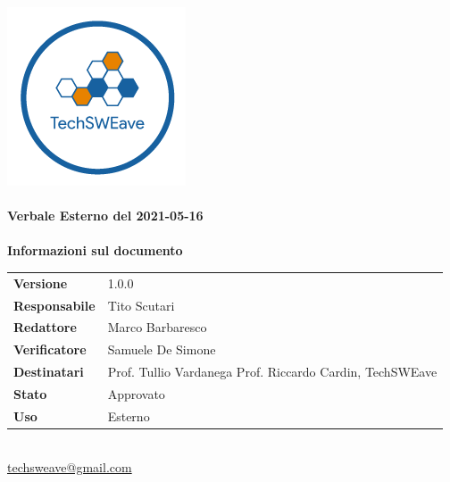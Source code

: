 \documentclass[a4paper]{article}
\begin{document}
\begin{titlepage}
    \begin{center}
        \includegraphics{../../../../Images/logo.png}\\
        \vspace{20px}
        \textcolor{logo}{\hrulefill}\\
        \vspace{20px}
        \textbf{\huge\textcolor{logo}{Verbale Esterno del 2021-05-16}}\\
        \vspace{10px}
        \textcolor{logo}{\hrulefill}\\
        \vspace{40px}
        \textbf{\Large Informazioni sul documento}\\
        \vspace{20px}
        \begin{tabular}{p{100px} | p{100px}}
            \textbf{Versione}     & 1.0.0                                                                      \\
            \textbf{Responsabile} & Tito Scutari                                                               \\
            \textbf{Redattore}    & Marco Barbaresco                                                           \\
            \textbf{Verificatore} & Samuele De Simone                                                          \\
            \textbf{Destinatari}  & Prof. Tullio Vardanega \newline Prof. Riccardo Cardin, \newline TechSWEave \\
            \textbf{Stato}        & Approvato                                                                  \\
            \textbf{Uso}          & Esterno                                                                    \\
        \end{tabular}\\
        \vspace{60px}
        \href{mailto:techsweave@gmail.com}{techsweave@gmail.com}\\

    \end{center}
\end{titlepage}
\end{document}
